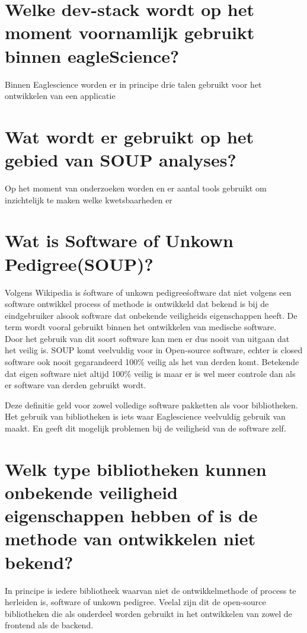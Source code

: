 \section{Welke dev-stack wordt op het moment voornamlijk gebruikt binnen eagleScience?}
Binnen Eaglescience worden er in principe drie talen gebruikt voor het ontwikkelen van een applicatie

\section{Wat wordt er gebruikt op het gebied van SOUP analyses?}
Op het moment van onderzoeken worden en er aantal tools gebruikt om inzichtelijk te maken welke kwetsbaarheden er



\section{Wat is Software of Unkown Pedigree(SOUP)?}
Volgens Wikipedia is \'software of unkown pedigree\' software dat niet volgens een software ontwikkel process of methode is ontwikkeld dat bekend is bij de eindgebruiker alsook software dat onbekende veiligheids eigenschappen heeft. De term wordt vooral gebruikt binnen het ontwikkelen van medische software.\\  %
Door het gebruik van dit soort software kan men er dus nooit van uitgaan dat het veilig is.  SOUP komt veelvuldig voor in Open-source software, echter is closed software ook nooit gegarandeerd 100\% veilig als het van derden komt. Betekende dat eigen software niet altijd 100\% veilig is maar er is wel meer controle dan als er software van derden gebruikt wordt.

Deze definitie geld voor zowel volledige software pakketten als voor bibliotheken. Het gebruik van bibliotheken is iets waar Eaglescience veelvuldig gebruik van maakt. En geeft dit mogelijk problemen bij de veiligheid van de software zelf.

\section{Welk type bibliotheken kunnen onbekende veiligheid eigenschappen hebben of is de methode van ontwikkelen niet bekend?}
In principe is iedere bibliotheek waarvan niet de ontwikkelmethode of process te herleiden is, software of unkown pedigree. Veelal zijn dit de open-source bibliotheken die als onderdeel worden gebruikt in het ontwikkelen van zowel de frontend als de backend.

